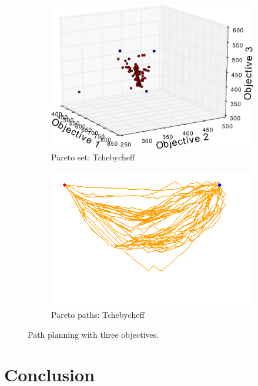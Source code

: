 \documentclass{article}
\begin{document}
\begin{figure}
\begin{subfigure}[b]{0.45\linewidth}
		\includegraphics[width=\textwidth]{fig/sim7-3obj/PF07-MORRT2.pdf}
		\caption{Pareto set: Tchebycheff}
		\label{fig:sim:many:pf:b}
	\end{subfigure} 
	\begin{subfigure}[b]{0.45\linewidth}
		\centering
		\includegraphics[width=\textwidth]{fig/sim7-3obj/MORRTstar02-ALL.png}
		\caption{Pareto paths: Tchebycheff}
		\label{fig:sim:many:sols:b}
	\end{subfigure}
	\caption{Path planning with three objectives.}
	\label{fig:sim:many}
\end{figure}

\section{Conclusion} 
\label{sec:conclusion}
\end{document}

